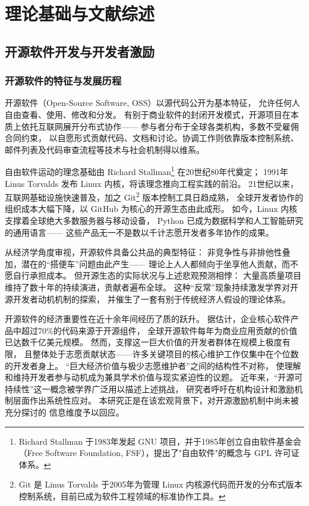 \documentclass[
    type = master, %
    degree = professional,        %
    decl-page,  %
    twoside,                %
    fontset = fandol %
  ]{njuthesis}
\begin{document}
\chapter{理论基础与文献综述}

\section{开源软件开发与开发者激励}

\subsection{开源软件的特征与发展历程}

开源软件（Open-Source Software, OSS）以源代码公开为基本特征，
允许任何人自由查看、使用、修改和分发\cite{lakhani2003open}。
有别于商业软件的封闭开发模式，开源项目在本质上依托互联网展开分布式协作——
参与者分布于全球各类机构，多数不受雇佣合同约束，
以自愿形式贡献代码、文档和讨论。协调工作则依靠版本控制系统、
邮件列表及代码审查流程等技术与社会机制得以维系。

自由软件运动的理念基础由 Richard Stallman\footnote{Richard Stallman 于1983年发起 GNU 项目，并于1985年创立自由软件基金会（Free Software Foundation, FSF），提出了"自由软件"的概念与 GPL 许可证体系。} 在20世纪80年代奠定；
1991年 Linus Torvalds 发布 Linux 内核，将该理念推向工程实践的前沿。
21世纪以来，互联网基础设施快速普及，加之 Git\footnote{Git 是 Linus Torvalds 于2005年为管理 Linux 内核源代码而开发的分布式版本控制系统，目前已成为软件工程领域的标准协作工具。} 版本控制工具日趋成熟，
全球开发者协作的组织成本大幅下降，以 GitHub 为核心的开源生态由此成形。
如今，Linux 内核支撑着全球绝大多数服务器与移动设备，
Python 已成为数据科学和人工智能研究的通用语言——
这些产品无一不是数以千计志愿开发者多年协作的成果。

从经济学角度审视，开源软件具备公共品的典型特征：
非竞争性与非排他性叠加，潜在的“搭便车”问题由此产生——
理论上人人都倾向于坐享他人贡献，而不愿自行承担成本\cite{lerner2002simple}。
但开源生态的实际状况与上述悲观预测相悖：
大量高质量项目维持了数十年的持续演进，贡献者遍布全球。
这种“反常”现象持续激发学界对开源开发者动机机制的探索\cite{gerosa2021shifting}，
并催生了一套有别于传统经济人假设的理论体系。

开源软件的经济重要性在近十余年间经历了质的跃升。
据估计，企业核心软件产品中超过70\%的代码来源于开源组件，
全球开源软件每年为商业应用贡献的价值已达数千亿美元规模。
然而，支撑这一巨大价值的开发者群体在规模上极度有限，
且整体处于志愿贡献状态——许多关键项目的核心维护工作仅集中在个位数的开发者身上\cite{lu2021core,jamieson2024predicting}。
“巨大经济价值与极少志愿维护者”之间的结构性不对称，
使理解和维持开发者参与动机成为兼具学术价值与现实紧迫性的议题。
近年来，“开源可持续性”这一概念被学界广泛用以描述上述挑战，
研究者呼吁在机构设计和激励机制层面作出系统性应对\cite{alami2024sustainability,wang2025opensource,qi2021opensource}。
本研究正是在该宏观背景下，对开源激励机制中尚未被充分探讨的
信息维度予以回应。
\end{document}
